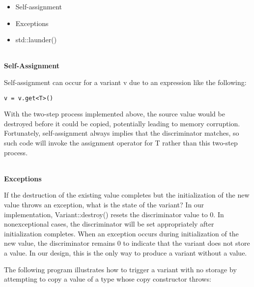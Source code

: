 \begin{itemize}
\item
Self-assignment

\item
Exceptions

\item
std::launder()
\end{itemize}


\hspace*{\fill} \\ %
\noindent
\textbf{Self-Assignment}

Self-assignment can occur for a variant v due to an expression like the following:

\begin{lstlisting}[style=styleCXX]
v = v.get<T>()
\end{lstlisting}

With the two-step process implemented above, the source value would be destroyed before it could be copied, potentially leading to memory corruption. Fortunately, self-assignment always implies that the discriminator matches, so such code will invoke the assignment operator for T rather than this two-step process.


\hspace*{\fill} \\ %
\noindent
\textbf{Exceptions}

If the destruction of the existing value completes but the initialization of the new value throws an exception, what is the state of the variant? In our implementation, Variant::destroy() resets the discriminator value to 0. In nonexceptional cases, the discriminator will be set appropriately after initialization completes. When an exception occurs during initialization of the new value, the discriminator remains 0 to indicate that the variant does not store a value. In our design, this is the only way to produce a variant without a value.

The following program illustrates how to trigger a variant with no storage by attempting to copy a value of a type whose copy constructor throws:

